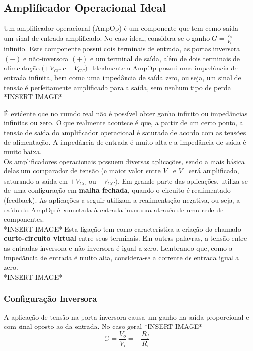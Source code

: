 \documentclass{article}
\numberwithin{equation}{section}
\begin{document}
    \subsection{Amplificador Operacional Ideal}
    \label{subsec:ampop}
    Um amplificador operacional (AmpOp) é um componente que tem como saída um sinal de entrada amplificado. No caso ideal, considera-se o ganho $G=\displaystyle{\frac{V_{o}}{V_{i}}}$ infinito. Este componente possui dois terminais de entrada, as portas inversora $(-)$ e não-inversora $(+)$ e um terminal de saída, além de dois terminais de alimentação $(+V_{CC}$ e $-V_{CC})$. Idealmente o AmpOp possui uma impedância de entrada infinita, bem como uma impedância de saída zero, ou seja, um sinal de tensão é perfeitamente amplificado para a saída, sem nenhum tipo de perda. \\
    *INSERT IMAGE*

    É evidente que no mundo real não é possível obter ganho infinito ou impedâncias infinitas ou zero. O que realmente acontece é que, a partir de um certo ponto, a tensão de saída do amplificador operacional é saturada de acordo com as tensões de alimentação. A impedância de entrada é muito alta e a impedância de saída é muito baixa. \\
    Os amplificadores operacionais possuem diversas aplicações, sendo a mais básica delas um comparador de tensão (o maior valor entre $V_{+}$ e $V_{-}$ será amplificado, saturando a saída em $+V_{CC}$ ou $-V_{CC})$. Em grande parte das aplicações, utiliza-se de uma configuração em \textbf{malha fechada}, quando o circuito é realimentado (feedback). As aplicações a seguir utilizam a realimentação negativa, ou seja, a saída do AmpOp é conectada à entrada inversora através de uma rede de componentes.\\
    *INSERT IMAGE*
    Esta ligação tem como característica a criação do chamado \textbf{curto-circuito virtual} entre seus terminais. Em outras palavras, a tensão entre as entradas inversora e não-inversora é igual a zero. Lembrando que, como a impedância de entrada é muito alta, considera-se a corrente de entrada igual a zero. \\
    *INSERT IMAGE*
    \subsubsection{Configuração Inversora}
    A aplicação de tensão na porta inversora causa um ganho na saída proporcional e com sinal oposto ao da entrada. No caso geral
    *INSERT IMAGE*
    \begin{equation}
        G=\frac{V_{o}}{V_{i}}=-\frac{R_{f}}{R_{i}}
    \end{equation}
\end{document}
